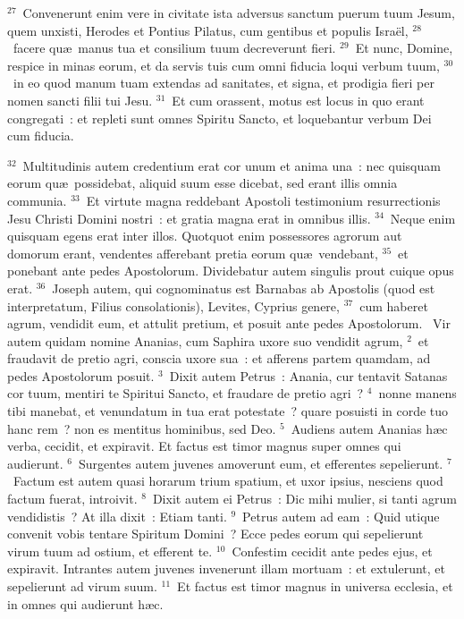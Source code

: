 ${}^{27}$~Convenerunt enim vere in civitate ista adversus sanctum puerum tuum Jesum, quem unxisti, Herodes et Pontius Pilatus, cum gentibus et populis Isra\"el,
${}^{28}$~facere qu\ae\ manus tua et consilium tuum decreverunt fieri.
${}^{29}$~Et nunc, Domine, respice in minas eorum, et da servis tuis cum omni fiducia loqui verbum tuum,
${}^{30}$~in eo quod manum tuam extendas ad sanitates, et signa, et prodigia fieri per nomen sancti filii tui Jesu.
${}^{31}$~Et cum orassent, motus est locus in quo erant congregati~: et repleti sunt omnes Spiritu Sancto, et loquebantur verbum Dei cum fiducia.


${}^{32}$~Multitudinis autem credentium erat cor unum et anima una~: nec quisquam eorum qu\ae\ possidebat, aliquid suum esse dicebat, sed erant illis omnia communia.
${}^{33}$~Et virtute magna reddebant Apostoli testimonium resurrectionis Jesu Christi Domini nostri~: et gratia magna erat in omnibus illis.
${}^{34}$~Neque enim quisquam egens erat inter illos. Quotquot enim possessores agrorum aut domorum erant, vendentes afferebant pretia eorum qu\ae\ vendebant,
${}^{35}$~et ponebant ante pedes Apostolorum. Dividebatur autem singulis prout cuique opus erat.
${}^{36}$~Joseph autem, qui cognominatus est Barnabas ab Apostolis (quod est interpretatum, Filius consolationis), Levites, Cyprius genere,
${}^{37}$~cum haberet agrum, vendidit eum, et attulit pretium, et posuit ante pedes Apostolorum.
~Vir autem quidam nomine Ananias, cum Saphira uxore suo vendidit agrum,
${}^{2}$~et fraudavit de pretio agri, conscia uxore sua~: et afferens partem quamdam, ad pedes Apostolorum posuit.
${}^{3}$~Dixit autem Petrus~: Anania, cur tentavit Satanas cor tuum, mentiri te Spiritui Sancto, et fraudare de pretio agri~?
${}^{4}$~nonne manens tibi manebat, et venundatum in tua erat potestate~? quare posuisti in corde tuo hanc rem~? non es mentitus hominibus, sed Deo.
${}^{5}$~Audiens autem Ananias h\ae c verba, cecidit, et expiravit. Et factus est timor magnus super omnes qui audierunt.
${}^{6}$~Surgentes autem juvenes amoverunt eum, et efferentes sepelierunt.
${}^{7}$~Factum est autem quasi horarum trium spatium, et uxor ipsius, nesciens quod factum fuerat, introivit.
${}^{8}$~Dixit autem ei Petrus~: Dic mihi mulier, si tanti agrum vendidistis~? At illa dixit~: Etiam tanti.
${}^{9}$~Petrus autem ad eam~: Quid utique convenit vobis tentare Spiritum Domini~? Ecce pedes eorum qui sepelierunt virum tuum ad ostium, et efferent te.
${}^{10}$~Confestim cecidit ante pedes ejus, et expiravit. Intrantes autem juvenes invenerunt illam mortuam~: et extulerunt, et sepelierunt ad virum suum.
${}^{11}$~Et factus est timor magnus in universa ecclesia, et in omnes qui audierunt h\ae c.


